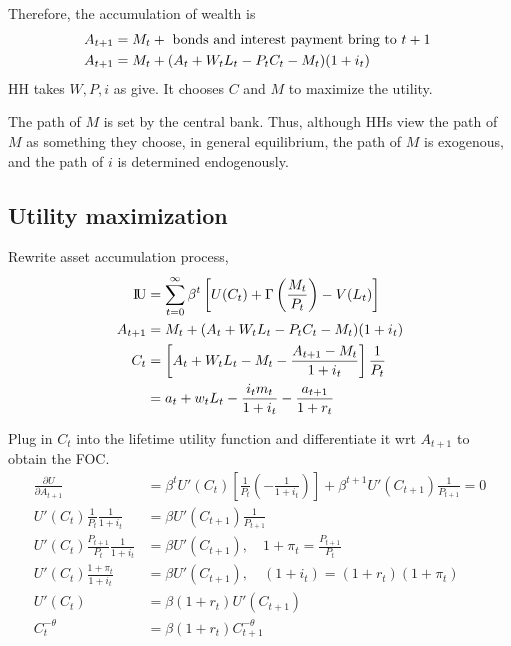 \documentclass[12pt]{article}
\begin{document}
Therefore, the accumulation of wealth is
\begin{align*}
A_{t + 1} &= M_{t} + \text{ bonds and interest payment bring to $ t + 1 $ }\\
A_{t + 1}&= M_{t} + (A_{t} + W_{t}L_{t} - P_{t}C_{t} - M_{t})(1 + i_{t})
\end{align*}
HH takes $ W, P, i $ as give. It chooses $ C $ and $ M $ to maximize the utility.

The path of $ M $ is set by the central bank. Thus, although HHs view the path of $ M $
as something they choose, in general equilibrium, the path of $ M $ is exogenous,
and the path of $ i $ is determined endogenously.


\subsection{Utility maximization}
Rewrite asset accumulation process,
\begin{align*}
{\rm I\!{U}} &= \sum\limits_{t = 0} ^\infty \beta^{t}	\left[ 
		U(C_{t}) + \Gamma \left( \frac{M_{t}}{P_{t}} \right)  - V(L_{t})
\right] \\
A_{t + 1}&= M_{t} + (A_{t} + W_{t}L_{t} - P_{t}C_{t} - M_{t})(1 + i_{t})\\
C_{t}&= \left[ A_{t} + W_{t}L_{t} - M_{t} - \frac{A_{t + 1} - M_{t}}{1 + i_{t}} \right] 
\frac{1}{P_{t}}\\
		 &= a_{t} + w_{t}L_{t} - \frac{i_{t}m_{t}}{1 + i_{t}} - \frac{a_{t + 1}}{1 + r_{t}}
\end{align*}

Plug in $ C_{t} $ into the lifetime utility function and differentiate it wrt 
$ A_{t + 1} $ to obtain the FOC.
\begin{align*}
\frac{\partial U }{\partial A_{t + 1} }&= 
\beta^{t}U'(C_{t})\left[ \frac{1}{P_{t}}\left(  - \frac{1}{1 + i_{t}} \right)  \right] 
 + \beta^{t + 1}U'(C_{t + 1})\frac{1}{P_{t + 1}} = 0\\
 U'(C_{t})\frac{1}{P_{t}}\frac{1}{1 + i_{t}} &= \beta U'(C_{t + 1})\frac{1}{P_{t + 1}}\\
 U'(C_{t})\frac{P_{t + 1}}{P_{t}}\frac{1}{1 + i_{t}}&= \beta U'(C_{t + 1}), \quad
 1 + \pi_{t} = \frac{P_{t + 1}}{P_{t}}\\
 U'(C_{t})\frac{1 + \pi_{t}}{1 + i_{t}}&= \beta U'(C_{t + 1}), \quad
 (1 + i_{t}) = (1 + r_{t})(1 + \pi_{t})\\
 U'(C_{t}) &= \beta(1 + r_{t})U'(C_{t + 1})\\
 C_{t}^{ - \theta}&= \beta(1 + r_{t})C_{t + 1}^{ - \theta}
\end{align*}
\end{document}
